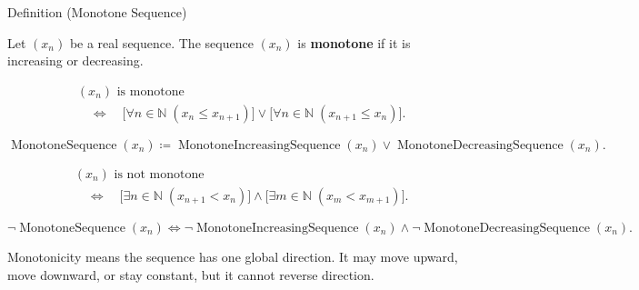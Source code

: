 
\begin{definitionbox}{Definition (Monotone Sequence)}
\begin{definition}
\label{def:monotone-sequence}
Let $(x_n)$ be a real sequence. The sequence $(x_n)$ is
\textbf{monotone} if it is increasing or decreasing.
\end{definition}
\end{definitionbox}

\begin{remark*}
\[
\begin{aligned}
&(x_n)\text{ is monotone}\\
&\quad\Longleftrightarrow\quad
\bigl[\forall n\in\mathbb{N}\;(x_n\le x_{n+1})\bigr]
\lor
\bigl[\forall n\in\mathbb{N}\;(x_{n+1}\le x_n)\bigr].
\end{aligned}
\]
\end{remark*}

\begin{remark*}
\[
\operatorname{MonotoneSequence}(x_n)
\coloneqq
\operatorname{MonotoneIncreasingSequence}(x_n)
\lor
\operatorname{MonotoneDecreasingSequence}(x_n).
\]
\end{remark*}

\begin{remark*}
\[
\begin{aligned}
&(x_n)\text{ is not monotone}\\
&\quad\Longleftrightarrow\quad
\bigl[\exists n\in\mathbb{N}\;(x_{n+1}<x_n)\bigr]
\land
\bigl[\exists m\in\mathbb{N}\;(x_m<x_{m+1})\bigr].
\end{aligned}
\]
\end{remark*}

\begin{remark*}
\[
\neg\operatorname{MonotoneSequence}(x_n)
\Longleftrightarrow
\neg\operatorname{MonotoneIncreasingSequence}(x_n)
\land
\neg\operatorname{MonotoneDecreasingSequence}(x_n).
\]
\end{remark*}

\begin{remark*}[Interpretation]
Monotonicity means the sequence has one global direction. It may move upward,
move downward, or stay constant, but it cannot reverse direction.
\end{remark*}

